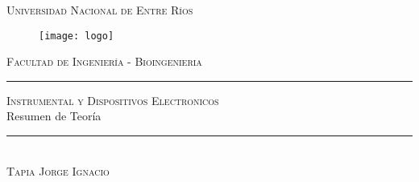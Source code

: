 \begin{titlepage}
	\begin{center}
		\centering \Huge \textsc{Universidad Nacional de Entre Ríos} \\
	\end{center}
\vspace{1cm}
	
	\begin{figure}[h]
		\centering
		\texttt{[image: logo]}	
	\end{figure}
\vspace{1.5cm}
	\centering \LARGE \textsc{Facultad de Ingeniería - Bioingenieria}
\vspace{1cm}
	
	\textcolor{blue-violet}{\rule{\linewidth}{0.75mm}}
	\vspace{1mm}
	\begin{spacing}{1.5}
		\centering \LARGE \textsc{Instrumental y Dispositivos Electronicos} \\
		\centering \LARGE {Resumen de Teoría}
	\end{spacing}
	\vspace{5mm}
	\textcolor{blue-violet}{\rule{\linewidth}{0.75mm}}\\
	\vspace{1cm}
	\centering \LARGE \textsc{Tapia Jorge Ignacio}
\end{titlepage}
